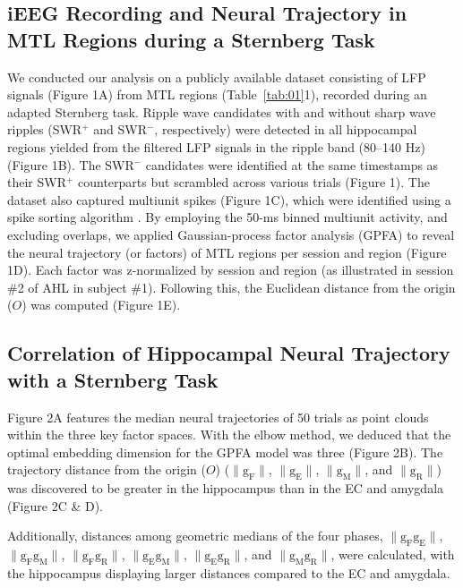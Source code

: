\documentclass[final,3p,times,twocolumn]{elsarticle}
\begin{document}
\subsection{iEEG Recording and Neural Trajectory in MTL Regions during a Sternberg Task}
We conducted our analysis on a publicly available dataset \cite{boran_dataset_2020} consisting of LFP signals (Figure 1A) from MTL regions (Table~\ref{tab:01}1), recorded during an adapted Sternberg task. Ripple wave candidates with and without sharp wave ripples (SWR$^+$ and SWR$^-$, respectively) were detected in all hippocampal regions yielded from the filtered LFP signals in the ripple band (80--140 Hz) (Figure 1B). The SWR$^-$ candidates were identified at the same timestamps as their SWR$^+$ counterparts but scrambled across various trials (Figure 1). The dataset also captured multiunit spikes (Figure 1C), which were identified using a spike sorting algorithm \cite{niediek_reliable_2016}. By employing the 50-ms binned multiunit activity, and excluding overlaps, we applied Gaussian-process factor analysis (GPFA) \cite{yu_gaussian-process_2009} to reveal the neural trajectory (or factors) of MTL regions per session and region (Figure 1D). Each factor was z-normalized by session and region (as illustrated in session \#2 of AHL in subject \#1). Following this, the Euclidean distance from the origin ($O$) was computed (Figure 1E).

\subsection{Correlation of Hippocampal Neural Trajectory with a Sternberg Task}
Figure 2A features the median neural trajectories of 50 trials as point clouds within the three key factor spaces. With the elbow method, we deduced that the optimal embedding dimension for the GPFA model was three (Figure 2B). The trajectory distance from the origin ($O$) ($\mathrm{\lVert g_{F} \rVert}$, $\mathrm{\lVert g_{E} \rVert}$, $\mathrm{\lVert g_{M} \rVert}$, and $\mathrm{\lVert g_{R} \rVert}$) was discovered to be greater in the hippocampus than in the EC and amygdala (Figure 2C \& D).

Additionally, distances among geometric medians of the four phases, $\mathrm{\lVert g_{F}g_{E} \rVert}$, $\mathrm{\lVert g_{F}g_{M} \rVert}$, $\mathrm{\lVert g_{F}g_{R} \rVert}$, $\mathrm{\lVert g_{E}g_{M} \rVert}$, $\mathrm{\lVert g_{E}g_{R} \rVert}$, and $\mathrm{\lVert g_{M}g_{R} \rVert}$, were calculated, with the hippocampus displaying larger distances compared to the EC and amygdala.
\end{document}
